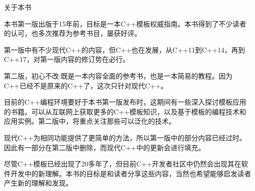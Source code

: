 \begin{flushright}
 关于本书
\end{flushright}

本书第一版出版于15年前，目标是一本C++模板权威指南。本书得到了不少读者的认可，也多次推荐为参考书目，屡获好评。

第一版中有不少现代C++的内容，但C++也在发展，从C++11到C++14，再到C++17，对第一版内容的修订势在必行。

第二版，初心不改:既是一本内容全面的参考书，也是一本简易的教程。因为C++已经不是原来的C++了，这次只针对现代C++。

目前的C++编程环境要好于本书第一版发布时，这期间有一些深入探讨模板应用的书籍。可以从互联网上获取更多的C++模板知识，以及基于模板的编程技术和应用实例。第二版中，将重点关注那些可以泛化的技术。

现代C++为相同功能提供了更简单的方法，所以第一版中的部分内容已经过时。因此有一部分在第二版中删除，而现代C++中的更新会进行填充。

尽管C++模板已经出现了20多年了，但目前C++开发者社区中仍然会出现其在软件开发中的新理解。本书的目标是和读者分享这些内容，当然也希望能够启发读者产生新的理解和发现。